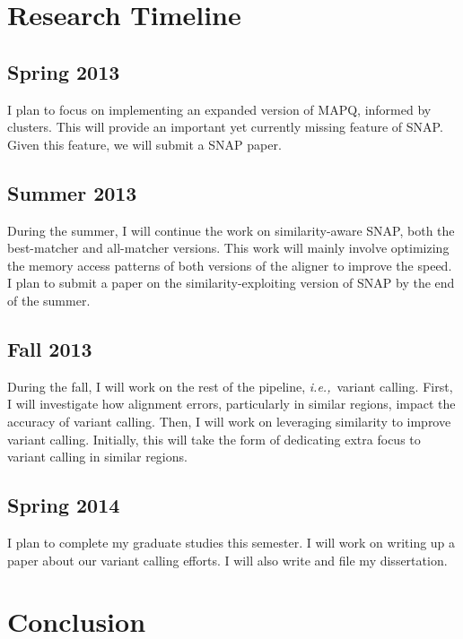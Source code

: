 \documentclass[twocolumn,10pt]{article}
\newcommand{\ie}{{\em i.e.,}~}
\begin{document}
\section{Research Timeline}

\subsection*{Spring 2013}
I plan to focus on implementing an expanded version of MAPQ, informed by clusters.  This will provide an important yet currently missing feature of SNAP.  Given this feature, we will submit a SNAP paper.

\subsection*{Summer 2013}
During the summer, I will continue the work on similarity-aware SNAP, both the best-matcher and all-matcher versions.  This work will mainly involve optimizing the memory access patterns of both versions of the aligner to improve the speed.  I plan to submit a paper on the similarity-exploiting version of SNAP by the end of the summer.

\subsection*{Fall 2013}
During the fall, I will work on the rest of the pipeline, \ie variant calling.  First, I will investigate how alignment errors, particularly in similar regions, impact the accuracy of variant calling.  Then, I will work on leveraging similarity to improve variant calling.  Initially, this will take the form of dedicating extra focus to variant calling in similar regions.

\subsection*{Spring 2014}
I plan to complete my graduate studies this semester.  I will work on writing up a paper about our variant calling efforts.  I will also write and file my dissertation.

\section{Conclusion}
\end{document}
